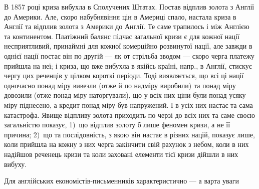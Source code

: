 В 1857 році криза вибухла в Сполучених Штатах. Постав відплив
золота з Англії до Америки. Але, скоро набубнявіння цін в Америці спало,
настала криза в Англії та відплив золота з Америки до Англії. Те саме трапилось
і між Англією та континентом. Платіжний балянс підчас загальної кризи
є для кожної нації несприятливий, принаймні для кожної комерційно розвинутої
нації, але завжди в однієї нації постає він по другій — як от стрільба
зводом — скоро черга платежу прийшла на неї; і криза, що вже вибухла в
якійсь країні, напр., в Англії, стискує чергу цих реченців у цілком короткі періоди.
Тоді виявляється, що всі ці нації одночасно понад міру вивезли (отже
й по надміру виробили) та понад міру довозили (отже понад міру наторгували),
що у всіх них ціни були понад усяку міру піднесено, а кредит понад міру був
напружений. І в усіх них настає та сама катастрофа. Явище відпливу золота
приходить по черзі до всіх них та саме своєю загальністю показує, 1)~що
відплив золоту б лише феномен кризи, а не її причина; 2)~що та послідовність,
з якою він настає в різних націй, показує лише, коли прийшла на кожну з них
черга закінчити свій рахунок з небом, коли в них надійшов реченець кризи
та коли заховані елементи тієї кризи дійшли в них вибуху.

Для англійських економістів-письменників характеристично — а варта уваги
\parbreak{}  %
